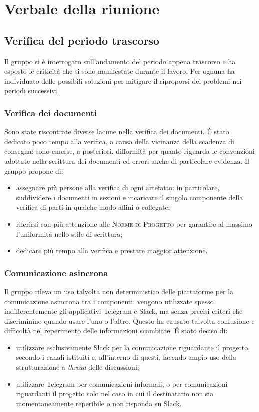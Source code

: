 \section{Verbale della riunione}

\subsection{Verifica del periodo trascorso}

Il gruppo si è interrogato sull'andamento del periodo appena trascorso e ha esposto le criticità che si sono manifestate durante il lavoro. Per ognuna ha individuato delle possibili soluzioni per mitigare il riproporsi dei problemi nei periodi successivi.  

\subsubsection{Verifica dei documenti}

Sono state riscontrate diverse lacune nella verifica dei documenti. \'E stato dedicato poco tempo alla verifica, a causa della vicinanza della scadenza di consegna: sono emerse, a posteriori, difformità per quanto riguarda le convenzioni adottate nella scrittura dei documenti ed errori anche di particolare evidenza. Il gruppo propone di:
\begin{itemize}
	\item assegnare più persone alla verifica di ogni artefatto: in particolare, suddividere i documenti in sezioni e incaricare il singolo componente della verifica di parti in qualche modo affini o collegate;
	\item riferirsi con più attenzione alle \textsc{Norme di Progetto} per garantire al massimo l'uniformità nello stile di scrittura;
	\item dedicare più tempo alla verifica e prestare maggior attenzione.
\end{itemize}

\subsubsection{Comunicazione asincrona}

Il gruppo rileva un uso talvolta non deterministico delle piattaforme per la comunicazione asincrona tra i componenti: vengono utilizzate spesso indifferentemente gli applicativi Telegram e Slack, ma senza precisi criteri che discriminino quando usare l'uno o l'altro. Questo ha causato talvolta confusione e difficoltà nel reperimento delle informazioni scambiate. \'E stato deciso di:
\begin{itemize}
	\item utilizzare esclusivamente Slack per la comunicazione riguardante il progetto, secondo i canali istituiti e, all'interno di questi, facendo ampio uso della strutturazione a \textit{thread} delle discussioni;
	\item utilizzare Telegram per comunicazioni informali, o per comunicazioni riguardanti il progetto solo nel caso in cui il destinatario non sia momentaneamente reperibile o non risponda su Slack.
\end{itemize}


